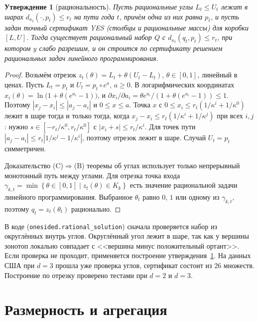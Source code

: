 \documentclass[a4paper,11pt]{article}
\theoremstyle{plain}
\newtheorem{proposition}[theorem]{Утверждение}
\theoremstyle{definition}
\theoremstyle{remark}
\newcommand{\abs}[1]{\left\lvert #1 \right\rvert}
\newcommand{\set}[1]{\left\{ #1 \right\}}
\begin{document}
\begin{proposition}[рациональность]\label{prop:rational}
    Пусть рациональные углы $L_t\le U_t$ лежат в шарах $d_{\kappa_t}(\cdot,p_t)\le r_t$ на пути года $t$, причём одна из них равна $p_t$, и пусть задан точный сертификат YES (столбцы и рациональные массы) для коробки $[L,U]$. Тогда существует рациональный набор $Q$ с $d_{\kappa_t}(q_t,p_t)\le r_t$, при котором $y$ слабо разрешим, и он строится по сертификату решением рациональных задач линейного программирования.
\end{proposition}

\begin{proof}
    Возьмём отрезок $z_t(\theta)=L_t+\theta(U_t-L_t)$, $\theta\in[0,1]$, линейный в ценах. Пусть $L_t=p_t$ и $U_t=p_t\circ e^{a}$, $a\ge0$. В логарифмических координатах $x_i(\theta)=\ln\bigl(1+\theta(e^{a_i}-1)\bigr)$, и $\partial x_i/\partial a_i=\theta e^{a_i}/(1+\theta(e^{a_i}-1))\le1$. Поэтому $\abs{x_j-x_i}\le\abs{a_j-a_i}$ и $0\le x\le a$. Точка $x$ с $0\le x_i\le r_t(1/\kappa^i+1/\kappa^0)$ лежит в шаре тогда и только тогда, когда $x_j-x_i\le r_t(1/\kappa^i+1/\kappa^j)$ при всех $i,j$: нужно $s\in[-r_t/\kappa^0,r_t/\kappa^0]$ с $\abs{x_i+s}\le r_t/\kappa^i$. Для точек пути $\abs{a_j-a_i}\le r_t\abs{1/\kappa^j-1/\kappa^i}$, поэтому отрезок лежит в шаре. Случай $U_t=p_t$ симметричен.

    Доказательство (C)$\Rightarrow$(B) теоремы об углах использует только непрерывный монотонный путь между углами. Для отрезка точка входа $\gamma_{k,t}=\min\set{\theta\in[0,1]\mid z_t(\theta)\in K_k}$ есть значение рациональной задачи линейного программирования. Выбранное $\theta_t$ равно $0$, $1$ или одному из $\gamma_{k,t}$, поэтому $q_t=z_t(\theta_t)$ рационально.
\end{proof}

В коде (\texttt{onesided.rational\_solution}) сначала проверяется набор из округлённых внутрь углов. Округлённый угол лежит в шаре, так как у вершины зонотоп локально совпадает с <<вершина минус положительный ортант>>. Если проверка не проходит, применяется построение утверждения~\ref{prop:rational}. На данных США при $d=3$ прошла уже проверка углов, сертификат состоит из 26 множеств. Построение по отрезку проверено тестами при $d=2$ и $d=3$.

\section{Размерность и агрегация}
\end{document}
